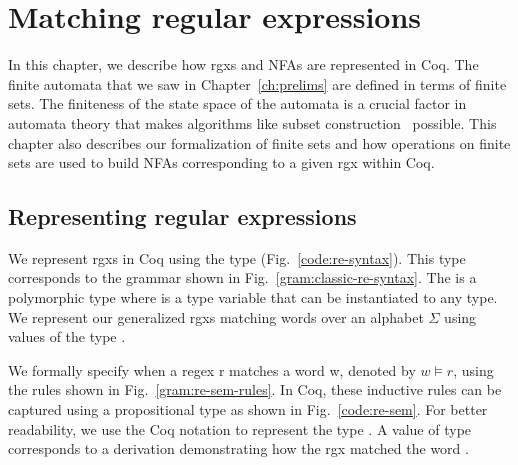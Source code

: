 \chapter{Matching regular expressions} \label{ch:method}
In this chapter, we describe how \glspl{rgx} and \glspl{NFA} are
represented in Coq.
The finite automata that we saw in Chapter~\ref{ch:prelims} are
defined in terms of finite sets.
The finiteness of the state space of the automata is a crucial factor
in automata theory that makes algorithms like subset
construction~\cite{rabin1959finite} possible.
This chapter also describes our formalization of finite sets and how
operations on finite sets are used to build \glspl{NFA} corresponding
to a given \gls{rgx} within Coq.

\section{Representing regular expressions}
We represent \glspl{rgx} in Coq using the  type
(Fig.~\ref{code:re-syntax}).
This type corresponds to the grammar shown in
Fig.~\ref{gram:classic-re-syntax}.
The  is a polymorphic type where  is a type variable
that can be instantiated to any type.
We represent our generalized \glspl{rgx} matching words over an alphabet
$\Sigma$ using values of the type .
%

We formally specify when a regex r matches a word w, denoted by $w
\models r$, using the rules shown in Fig.~\ref{gram:re-sem-rules}.
In Coq, these inductive rules can be captured using a propositional
type  as shown in Fig.~\ref{code:re-sem}.
For better readability, we use the Coq notation 
to represent the type .
A value of type  corresponds to a derivation
demonstrating how the \gls{rgx}  matched the word .

